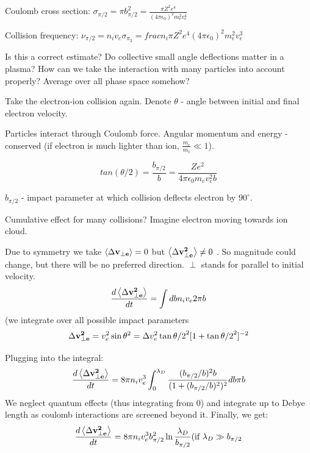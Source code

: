 Coulomb cross section: $\sigma_{\pi/2} = \pi b_{\pi/2}^2 = \frac{\pi Z^2 e^4}{(4 \pi \epsilon_0)^2 m_e^2 v_e^4}$

Collision frequency: $\nu_{\pi/2} = n_i v_e \sigma_{\pi_2} = frac{n_i \pi Z^2 e^4}{(4 \pi \epsilon_0)^2 m_e^2 v_e^3}$

Is this a correct estimate? Do collective small angle deflections matter in a plasma? How can we take the interaction with many particles into account properly? Average over all phase space somehow?

Take the electron-ion collision again.
Denote $\theta$ - angle between initial and final electron velocity.

Particles interact through Coulomb force. Angular momentum and energy - conserved (if electron is much lighter than ion, $\frac{m_e}{m_i} \ll 1$).

\[ tan(\theta/2) = \frac{b_{\pi/2}}{b} = \frac{Ze^2}{4 \pi \epsilon_0 m_e v_e^2 b} \]

$b_{\pi/2}$ - impact parameter at which collision deflects electron by $90^\circ$.

Cumulative effect for many collisions? Imagine electron moving towards ion cloud.

Due to symmetry we take $\left< \Delta \mathbf{v_{\perp e}} \right> =0$ but $\left< \Delta \mathbf{v_{\perp e}^2} \right> \neq 0$ . So magnitude could change, but there will be no preferred direction. $\perp$ stands for parallel to initial velocity.
\[\frac{d \left< \Delta \mathbf{v_{\perp e}^2} \right>}{d t} =\int db n_i v_e 2 \pi b \]
(we integrate over all possible impact parameters
\[ \Delta \mathbf{v_{\perp e}^2} = v_e^2 \sin{\theta}^2 = \Delta v_e^2 \tan{\theta/2}^2 [1+\tan{\theta/2}^2]^{-2} \]

Plugging into the integral:
\[\frac{d \left< \Delta \mathbf{v_{\perp e}^2} \right>}{d t} =8 \pi n_i v_e^3 \int_0^{\lambda_D} \frac{(b_{\pi/2} / b)^2 b}{(1+(b_{\pi/2} / b)^2)^2} db \pi b \]
We neglect quantum effects (thus integrating from 0) and integrate up to Debye length as coulomb interactions are screened beyond it. Finally, we get:
\[\frac{d \left< \Delta \mathbf{v_{\perp e}^2} \right>}{d t} = 8 \pi n_i v_e^3 b_{\pi/2}^2 \ln{\frac{\lambda_D}{b_{\pi/2}}} \text{(if $\lambda_D \gg b_{\pi/2}$} \]

